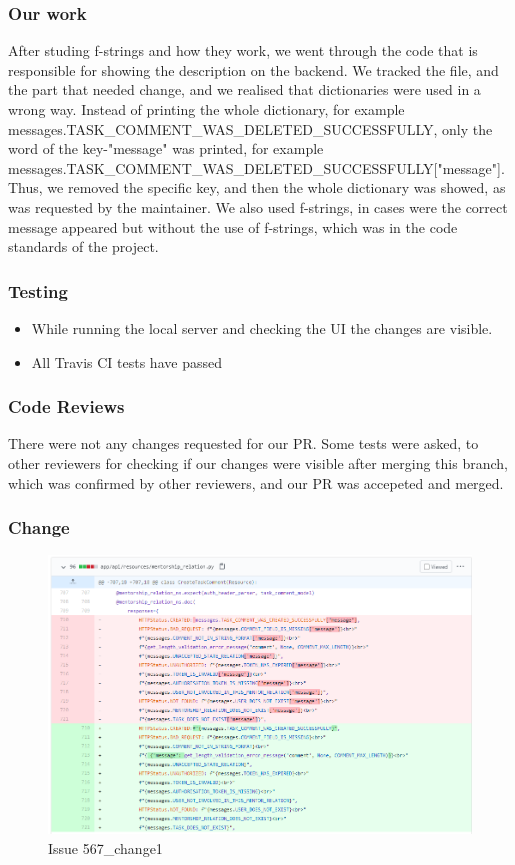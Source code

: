 \documentclass{article}
\begin{document}
\subsubsection{Our work}
After studing f-strings and how they work, we went through the code that is responsible for showing the description on the backend. We tracked the file, and the part that needed change, and we realised that dictionaries were used in a wrong way. Instead of printing the whole dictionary, for example messages.TASK\_COMMENT\_WAS\_DELETED\_SUCCESSFULLY, only the word of the key-"message" was printed, for example messages.TASK\_COMMENT\_WAS\_DELETED\_SUCCESSFULLY["message"]. Thus, we removed the specific key, and then the whole dictionary was showed, as was requested by the maintainer. We also used f-strings, in cases were the correct message appeared but without the use of f-strings, which was in the code standards of the project.
\subsubsection{Testing}
\begin{itemize}
\item While running the local server and checking the UI the changes are visible.
\item All Travis CI tests have passed
\end{itemize}
\subsubsection{Code Reviews}
There were not any changes requested for our PR. Some tests were asked, to other reviewers for checking if our changes were visible after merging this branch, which was confirmed by other reviewers, and our PR was accepeted and merged.
\subsubsection{Change}
\begin{figure}[tph!]
\centerline{\includegraphics[totalheight=15cm, width=16cm]{567Changes_1.png}}
    \caption{Issue 567\_change1}
    \label{fig:verticalcell}
\end{figure}
\end{document}
